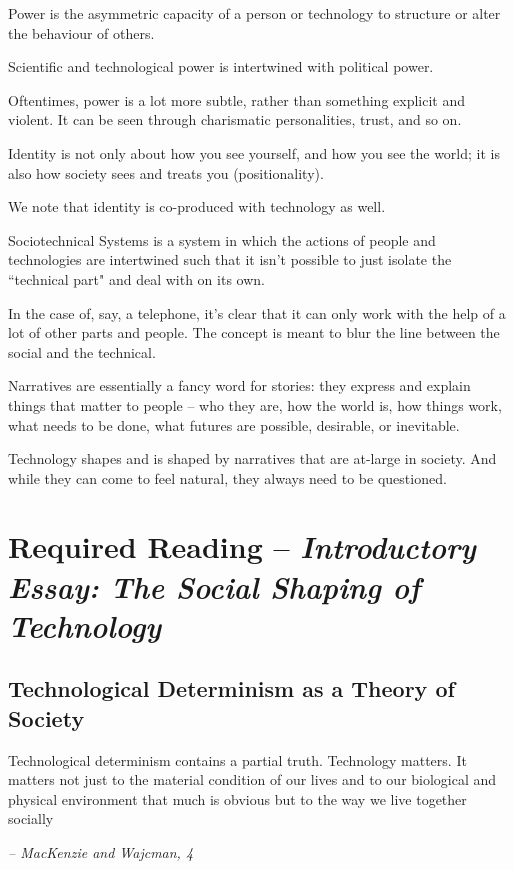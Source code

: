 \documentclass[openany]{book}
\begin{document}
\begin{defn}[Power]
	Power is the asymmetric capacity of a person or technology to structure or alter the behaviour of others.
	
	Scientific and technological power is intertwined with political power.
\end{defn}

Oftentimes, power is a lot more subtle, rather than something explicit and violent. It can be seen through charismatic personalities, trust, and so on.

\begin{defn}
	Identity is not only about how you see yourself, and how you see the world; it is also how society sees and treats you (positionality).
\end{defn}

We note that identity is co-produced with technology as well.

\begin{defn}
	Sociotechnical Systems is a system in which the actions of people and technologies are intertwined such that it isn't possible to just isolate the ``technical part" and deal with on its own.
\end{defn}

In the case of, say, a telephone, it's clear that it can only work with the help of a lot of other parts and people. The concept is meant to blur the line between the social and the technical.

\begin{defn}[Narratives]
	Narratives are essentially a fancy word for stories: they express and explain things that matter to people -- who they are, how the world is, how things work, what needs to be done, what futures are possible, desirable, or inevitable.
	
	Technology shapes and is shaped by narratives that are at-large in society. And while they can come to feel natural, they always need to be questioned.
\end{defn}

\section{Required Reading -- \textit{Introductory Essay: The Social Shaping of Technology}}
\subsection{Technological Determinism as a Theory of Society}
\begin{fancyquotes}
	Technological determinism contains a partial truth. Technology matters. It matters not just to the material condition of our lives and to our biological and physical environment that much is obvious but to the way we live together socially
	
	\begin{flushright}
		\emph{-- MacKenzie and Wajcman, 4}
	\end{flushright}
\end{fancyquotes}
\end{document}
